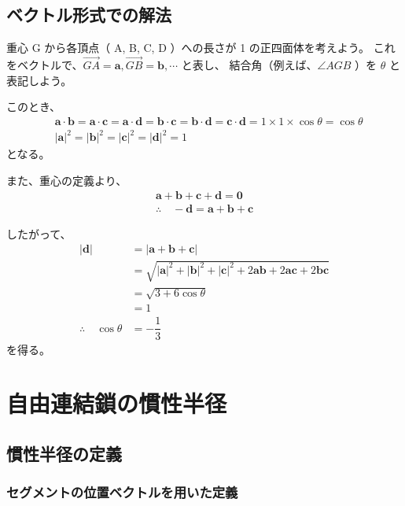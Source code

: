 \documentclass[a4paper,11pt]{ltjsarticle}
\begin{document}
\begin{appendix}
\subsection{ベクトル形式での解法}

重心 G から各頂点（ A, B, C, D ）への長さが 1 の正四面体を考えよう。
これをベクトルで、$\overrightarrow{GA} = {\bm a}, \overrightarrow{GB} = {\bm b}, \cdots$ と表し、
結合角（例えば、$\angle AGB$ ）を $\theta$ と表記しよう。

このとき、
\begin{align*}
&{\bm a} \cdot {\bm b} = {\bm a} \cdot {\bm c} = {\bm a} \cdot {\bm d} = {\bm b} \cdot {\bm c} = {\bm b} \cdot {\bm d} = {\bm c} \cdot {\bm d} = 1 \times 1 \times \cos \theta = \cos \theta \\
&|{\bm a}|^2 = |{\bm b}|^2 = |{\bm c}|^2 = |{\bm d}|^2 = 1
\end{align*}
となる。

また、重心の定義より、
\begin{align*}
{\bm a} + {\bm b} + {\bm c} + {\bm d} = {\bm 0} \\
\therefore \quad -{\bm d} ={\bm a} + {\bm b} + {\bm c}
\end{align*}

したがって、
\begin{align*}
|{\bm d} | 
	&= |{\bm a} + {\bm b} + {\bm c}| \\
	&= \sqrt{ |{\bm a}|^2 + |{\bm b}|^2 + |{\bm c}|^2 + 2{\bm a}{\bm b} + 2{\bm a}{\bm c} + 2{\bm b}{\bm c} } \\
	&= \sqrt{ 3 + 6 \cos \theta } \\
	&= 1 \\
\therefore \quad \cos \theta &= -\dfrac{1}{3}
\end{align*}
を得る。

\newpage

\section{自由連結鎖の慣性半径}
\label{sec:rg}

\subsection{慣性半径の定義}

\subsubsection{セグメントの位置ベクトルを用いた定義}


\end{appendix}
\end{document}
